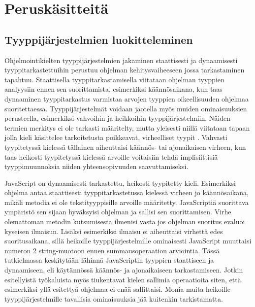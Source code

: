 \chapter{Peruskäsitteitä}

\section{Tyyppijärjestelmien luokitteleminen}
Ohjelmointikielten tyyppijärjestelmien jakaminen staattisesti ja dynaamisesti
tyyppitarkastettuihin perustuu ohjelman kehitysvaiheeseen jossa tarkastaminen
tapahtuu. Staattisella tyyppitarkastamisella viitataan ohjelman tyyppien
analyysiin ennen sen suorittamista, esimerkiksi käännösaikana, kun taas
dynaaminen tyyppitarkastus varmistaa arvojen tyyppien oikeellisuuden ohjelmaa
suoritettaessa. Tyyppijärjestelmät voidaan jaotella myös muiden
ominaisuuksien perusteella, esimerkiksi vahvoihin ja heikkoihin
tyyppijärjestelmiin. Näiden termien merkitys ei ole tarkasti määritelty,
mutta yleisesti niillä viitataan tapaan jolla kieli käsittelee tarkoitetusta
poikkeavat, virheelliset tyypit \cite{CornellTransitionToOO}. Vahvasti
tyypitetyssä kielessä tällainen aiheuttaisi käännös- tai ajonaikaisen
virheen, kun taas heikosti tyypitetyssä kielessä arvoille voitaisiin tehdä
implisiittisiä tyyppimuunnoksia niiden yhteensopivuuden saavuttamiseksi.

JavaScript on dynaamisesti tarkastettu, heikosti tyypitetty kieli.
Esimerkiksi ohjelma  antaa
staattisesti tyyppitarkastetussa kielessä virheen jo käännösaikana, mikäli
metodia  ei ole tekstityyppisille arvoille määritetty.
JavaScriptiä suorittava ympäristö sen sijaan hyväksyisi ohjelman ja sallisi
sen suorittamisen. Virhe olemattoman metodin kutsumisesta ilmenisi vasta jos
ohjelman suoritus evaluoi kyseisen ilmaisun. Lisäksi esimerkiksi ilmaisu
 ei aiheuttaisi virhettä edes 
suoritusaikana, sillä heikoille tyyppijärjestelmille ominaisesti JavaScript
muuttaisi numeron 2 string-muotoon ennen summausoperaation arviointia. Tässä
tutkielmassa keskitytään lähinnä JavaScriptin tyyppien staattiseen ja
dynaamiseen, eli käytännössä käännös- ja ajonaikaiseen tarkastamiseen. Jotkin
esitellyistä työkaluista myös tiukentavat kielen sallimia operaatioita siten,
että esimerkiksi yllä esitettyä  ohjelmaa
ei enää sallittaisi. Monia muita heikoille tyyppijärjestelmille
tavallisia ominaisuuksia jää kuitenkin tarkistamatta.

